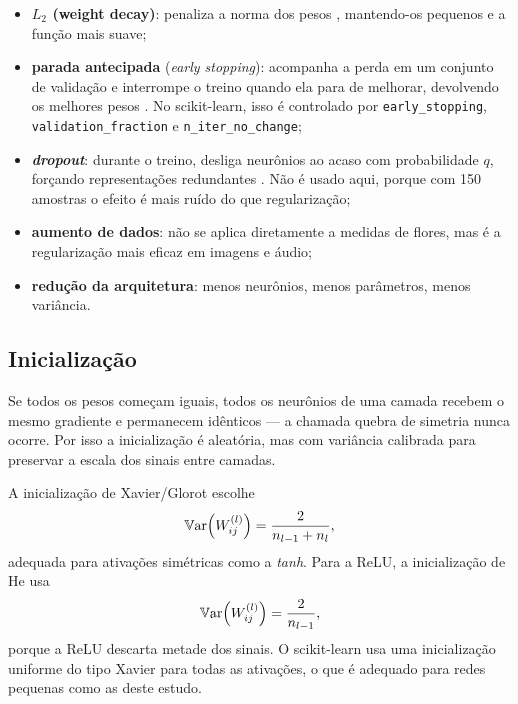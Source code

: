 \begin{itemize}
	\item \textbf{$L_2$ (weight decay)}: penaliza a norma dos pesos
	      , mantendo-os pequenos e a função mais suave;
	\item \textbf{parada antecipada} (\emph{early stopping}): acompanha a perda em um conjunto de
	      validação e interrompe o treino quando ela para de melhorar, devolvendo os melhores pesos
	      \cite{prechelt1998}. No scikit-learn, isso é controlado por \texttt{early\_stopping},
	      \texttt{validation\_fraction} e \texttt{n\_iter\_no\_change};
	\item \textbf{\emph{dropout}}: durante o treino, desliga neurônios ao acaso com probabilidade
	      $q$, forçando representações redundantes \cite{srivastava2014}. Não é usado aqui, porque
	      com 150 amostras o efeito é mais ruído do que regularização;
	\item \textbf{aumento de dados}: não se aplica diretamente a medidas de flores, mas é a
	      regularização mais eficaz em imagens e áudio;
	\item \textbf{redução da arquitetura}: menos neurônios, menos parâmetros, menos variância.
\end{itemize}

\subsection{Inicialização}

Se todos os pesos começam iguais, todos os neurônios de uma camada recebem o mesmo gradiente e
permanecem idênticos --- a chamada quebra de simetria nunca ocorre. Por isso a inicialização é
aleatória, mas com variância calibrada para preservar a escala dos sinais entre camadas.

A inicialização de Xavier/Glorot \cite{glorot2010} escolhe
\begin{equation}
	\mathbb{V}\mathrm{ar}\!\left(W_{ij}^{(l)}\right) = \frac{2}{n_{l-1}+n_l},
	\label{eq:xavier}
\end{equation}
adequada para ativações simétricas como a \emph{tanh}. Para a ReLU, a inicialização de He
\cite{he2015} usa
\begin{equation}
	\mathbb{V}\mathrm{ar}\!\left(W_{ij}^{(l)}\right) = \frac{2}{n_{l-1}},
	\label{eq:he}
\end{equation}
porque a ReLU descarta metade dos sinais. O scikit-learn usa uma inicialização uniforme do tipo
Xavier para todas as ativações, o que é adequado para redes pequenas como as deste estudo.


